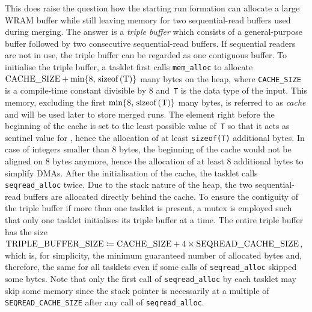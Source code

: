 This does raise the question how the starting run formation can allocate a large WRAM buffer while still leaving memory for two sequential-read buffers used during merging.
The answer is a \emph{triple buffer} which consists of a general-purpose buffer followed by two consecutive sequential-read buffers.
If sequential readers are not in use, the triple buffer can be regarded as one contiguous buffer.
To initialise the triple buffer, a tasklet first calls \lstinline|mem_alloc| to allocate \(\text{\lstinline|CACHE_SIZE|} + \min\braces{ 8, \text{\lstinline[keywords={}]|sizeof(T)|} }\) many bytes on the heap, where \lstinline|CACHE_SIZE| is a compile-time constant divisible by 8 and~\lstinline|T| is the data type of the input.
This memory, excluding the first \(\min\braces{ 8, \text{\lstinline[keywords={}]|sizeof(T)|} }\) many bytes, is referred to as \emph{cache} and will be used later to store merged runs.
The element right before the beginning of the cache is set to the least possible value of~\lstinline|T| so that it acts as sentinel value for \IS{}, hence the allocation of at least \lstinline[keywords={}]|sizeof(T)| additional bytes.
In case of integers smaller than 8 bytes, the beginning of the cache would not be aligned on 8 bytes anymore, hence the allocation of at least 8 additional bytes to simplify DMAs.
After the initialisation of the cache, the tasklet calls \lstinline|seqread_alloc| twice.
Due to the stack nature of the heap, the two sequential-read buffers are allocated directly behind the cache.
To ensure the contiguity of the triple buffer if more than one tasklet is present, a mutex is employed such that only one tasklet initialises its triple buffer at a time.
The entire triple buffer has the size \(\triplebuffersize \coloneqq \text{\lstinline|CACHE_SIZE|} + 4 \times \text{\lstinline|SEQREAD_CACHE_SIZE|}\), which is, for simplicity, the minimum guaranteed number of allocated bytes and, therefore, the same for all tasklets even if some calls of \lstinline|seqread_alloc| skipped some bytes.
Note that only the first call of \lstinline|seqread_alloc| by each tasklet may skip some memory since the stack pointer is necessarily at a multiple of \lstinline|SEQREAD_CACHE_SIZE| after any call of \lstinline|seqread_alloc|.

